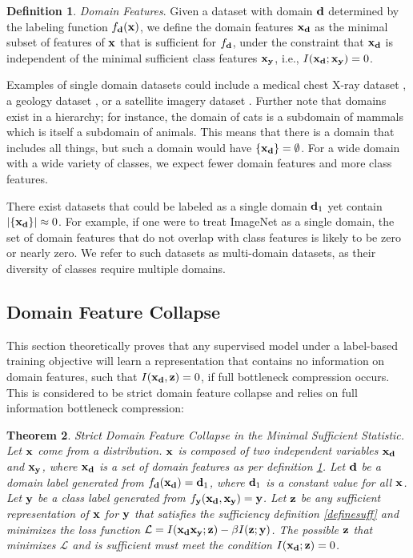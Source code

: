 \documentclass[letterpaper]{article} %
\theoremstyle{plain}
\newtheorem{theorem}{Theorem}[section]
\theoremstyle{definition}
\newtheorem{definition}[theorem]{Definition}
\theoremstyle{remark}
\begin{document}
\begin{definition}
\emph{Domain Features}. Given a dataset with domain ${\mathbf{d}}$ determined by the labeling function $f_{{\mathbf{d}}}({\mathbf{x}})$, we define the domain features ${\mathbf{x}}_{\mathbf{d}}$ as the minimal subset of features of ${\mathbf{x}}$ that is sufficient for $f_{{\mathbf{d}}}$, under the constraint that ${\mathbf{x}}_{\mathbf{d}}$ is independent of the minimal sufficient class features ${\mathbf{x}}_{\mathbf{y}}$, i.e., $I({\mathbf{x}}_{\mathbf{d}} ; {\mathbf{x}}_{\mathbf{y}}) = 0$.
\label{definedomainfeatures}
\end{definition}

Examples of single domain datasets could include a medical chest X-ray dataset \citep{yang2023medmnist}, a geology dataset \citep{rock_data}, or a satellite imagery dataset \citep{helber2019eurosat}. Further note that domains exist in a hierarchy; for instance, the domain of cats is a subdomain of mammals which is itself a subdomain of animals. This means that there is a domain that includes all things, but such a domain would have $\{{\mathbf{x}}_{\mathbf{d}}\} = \emptyset$. For a wide domain with a wide variety of classes, we expect fewer domain features and more class features. 

There exist datasets that could be labeled as a single domain ${\mathbf{d}}_1$ yet contain $|\{{\mathbf{x}}_{\mathbf{d}}\}| \approx 0$. For example, if one were to treat ImageNet as a single domain, the set of domain features that do not overlap with class features is likely to be zero or nearly zero. We refer to such datasets as multi-domain datasets, as their diversity of classes require multiple domains. 

\subsection{Domain Feature Collapse}

This section theoretically proves that any supervised model under a label-based training objective will learn a representation that contains no information on domain features, such that $I({\mathbf{x}}_{\mathbf{d}}, {\mathbf{z}}) = 0$, if full bottleneck compression occurs. This is considered to be strict domain feature collapse and relies on full information bottleneck compression: 
\begin{theorem} \textcolor{black}{Strict} Domain Feature Collapse in the Minimal Sufficient Statistic. \\
    Let ${\mathbf{x}}$ come from a distribution. ${\mathbf{x}}$ is composed of two independent variables ${\mathbf{x}}_{\mathbf{d}}$ and ${\mathbf{x}}_{\mathbf{y}}$, where ${\mathbf{x}}_{\mathbf{d}}$ is a set of domain features as per definition \ref{definedomainfeatures}. Let ${\mathbf{d}}$ be a domain label generated from $f_{\mathbf{d}}({\mathbf{x}}_{\mathbf{d}}) = {\mathbf{d}}_1$, where ${\mathbf{d}}_1$ is a constant value for all ${\mathbf{x}}$. Let ${\mathbf{y}}$ be a class label generated from $f_{\mathbf{y}}({\mathbf{x}}_{\mathbf{d}}, {\mathbf{x}}_{\mathbf{y}}) = {\mathbf{y}}$. Let ${\mathbf{z}}$ be any sufficient representation of ${\mathbf{x}}$ for ${\mathbf{y}}$ that satisfies the sufficiency definition \ref{definesuff} and minimizes the loss function $\mathcal{L} = I({\mathbf{x}}_{\mathbf{d}} {\mathbf{x}}_{\mathbf{y}}; {\mathbf{z}}) - \beta I({\mathbf{z}};{\mathbf{y}})$. The possible ${\mathbf{z}}$ that minimizes $\mathcal{L}$ and is sufficient must meet the condition $I({\mathbf{x}}_{\mathbf{d}}; {\mathbf{z}}) = 0$. 



    \label{mainbodygenloss}
\end{theorem}
\end{document}
